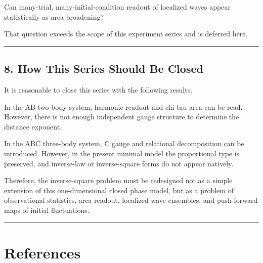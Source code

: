 \documentclass[
]{article}
\newenvironment{Shaded}{}{}
\newcommand{\NormalTok}[1]{#1}
\begin{document}
\begin{Shaded}
\begin{Highlighting}[]
\NormalTok{Can many{-}trial, many{-}initial{-}condition readout of localized waves appear statistically as area broadening?}
\end{Highlighting}
\end{Shaded}

That question exceeds the scope of this experiment series and is
deferred here.

\begin{center}\rule{0.5\linewidth}{0.5pt}\end{center}

\subsection{8. How This Series Should Be
Closed}\label{how-this-series-should-be-closed}

It is reasonable to close this series with the following results.

\begin{Shaded}
\begin{Highlighting}[]
\NormalTok{In the AB two{-}body system, harmonic readout and chi{-}tau area can be read.}
\NormalTok{However, there is not enough independent gauge structure to determine the distance exponent.}

\NormalTok{In the ABC three{-}body system, C gauge and relational decomposition can be introduced.}
\NormalTok{However, in the present minimal model the proportional type is preserved,}
\NormalTok{and inverse{-}law or inverse{-}square forms do not appear natively.}

\NormalTok{Therefore, the inverse{-}square problem must be redesigned not as a simple extension}
\NormalTok{of this one{-}dimensional closed phase model, but as a problem of observational statistics,}
\NormalTok{area readout, localized{-}wave ensembles, and push{-}forward maps of initial fluctuations.}
\end{Highlighting}
\end{Shaded}

\begin{center}\rule{0.5\linewidth}{0.5pt}\end{center}

\section{References}\label{references}
\end{document}
